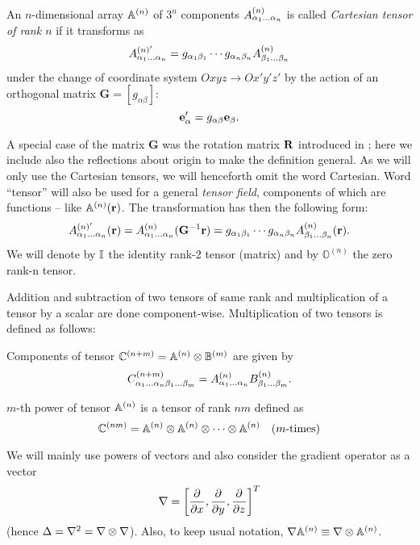 \begin{definition}\label{def:tensor}
  An $n$-dimensional array $\AA$ of $3^n$ components $\AAA{\alpha_1\ldots\alpha_n}$ is called \textit{Cartesian tensor 
  of rank $n$} if it transforms as
  \begin{equation}\label{eq:tenstran}
    A^{(n)'}_{\alpha_1\ldots\alpha_n} = g_{\alpha_1\beta_1}\cdots g_{\alpha_n\beta_n}\AAA{\beta_1\ldots\beta_n}
  \end{equation}
  under the change of coordinate system $Oxyz \to Ox'y'z'$ by the action of an orthogonal matrix $\mathbf{G} = [g_{\alpha\beta}]$:
  $$
    \be_\alpha' = g_{\alpha\beta}\be_\beta.
  $$
\end{definition}
A special case of the matrix $\mathbf{G}$ was the rotation matrix $\mat{R}$ introduced in ; here we
include also the reflections about origin to make the definition general. As we will only use the Cartesian tensors, we
will henceforth omit the word Cartesian. Word ``tensor'' will also be used for a general \textit{tensor field},
components of which are functions -- like $\AA(\br)$. The transformation has then the following form:
$$
  A^{(n)'}_{\alpha_1\ldots\alpha_n}(\br) = \AAA{\alpha_1\ldots\alpha_n}(\mathbf{G}^{-1}\br) = g_{\alpha_1\beta_1}\cdots g_{\alpha_n\beta_n}\AAA{\beta_1\ldots\beta_n}(\br).
$$
We will denote by $\eye$ the identity rank-2 tensor (matrix) and by $ \mathbb{O}^{(n)}$ the zero rank-n tensor.

Addition and subtraction of two tensors of same rank and multiplication of a tensor by a scalar are done component-wise. 
Multiplication of two tensors is defined as follows:
\begin{definition}
  Components of tensor $\CC[n+m] = \AA\otimes\BB[m]$ are given by
  $$
    \CCC[n+m]{\alpha_1\ldots\alpha_n\beta_1\ldots\beta_m} = \AAA{\alpha_1\ldots\alpha_n}\BBB{\beta_1\ldots\beta_m}.
  $$
\end{definition}

\begin{definition}
  $m$-th power of tensor $\AA$ is a tensor of rank $nm$ defined as
  $$
    \CC[nm] = \AA\otimes\AA\otimes\cdots\otimes\AA\quad \mbox{($m$-times)}
  $$
\end{definition}
We will mainly use powers of vectors and also consider the gradient operator as a vector
$$
  \nabla = \left[\pd{}{x}, \pd{}{y}, \pd{}{z}\right]^T
$$
(hence $\Delta = \lap = \nabla\otimes\nabla$). Also, to keep usual notation, $\nabla\AA \equiv \nabla\otimes\AA$.

